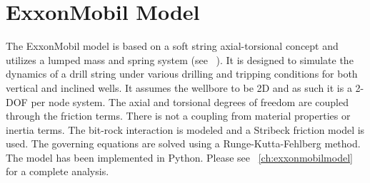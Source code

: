 \section{ExxonMobil Model}
The ExxonMobil model is based on a soft string axial-torsional concept and utilizes a lumped mass and spring system (see ~\cite{ref:dixit2021a}). It is designed to simulate the dynamics of a drill string under various drilling and tripping conditions for both vertical and inclined wells. It assumes the wellbore to be 2D and as such it is a 2-DOF per node system. The axial and torsional degrees of freedom are coupled through the friction terms. There is not a coupling from material properties or inertia terms.  The bit-rock interaction is modeled and a Stribeck friction model is used. The governing equations are solved using a Runge-Kutta-Fehlberg method. The model has been implemented in Python.  Please see \chaptername~\ref{ch:exxonmobilmodel} for a complete analysis. 